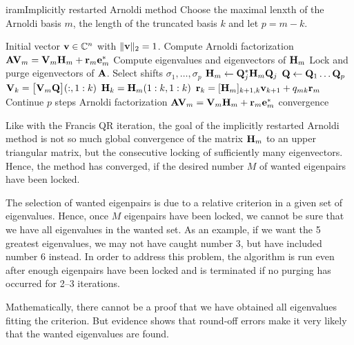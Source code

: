 \begin{Algorithm*}{iram}{Implicitly restarted Arnoldi method}
  Choose the maximal lenxth of the Arnoldi basis $m$, the length of
  the truncated basis $k$ and let $p=m-k$.
  \begin{algorithmic}[1]
    \Require Initial vector $\mathbf v\in\mathbb C^n$ with $\lVert\mathbf v\rVert_2=1$.
    \State Compute Arnoldi factorization
    $\mathbf A\mathbf V_m = \mathbf V_m\mathbf H_m + \mathbf r_m\mathbf e_m^*$
    \Repeat
    \State Compute eigenvalues and eigenvectors of $\mathbf H_m$
    \State Lock and purge eigenvectors of $\mathbf A$.
    \State Select shifts $\sigma_1,\dots,\sigma_p$
    \State $\mathbf H_m \gets \mathbf Q_j^*\mathbf H_m\mathbf Q_j$
    \EndFor
    \State $\mathbf Q \gets \mathbf Q_1\dots\mathbf Q_p$
    \State $\mathbf V_k = \bigl[\mathbf V_m\mathbf Q\bigr](:,1:k)$
    \State $\mathbf H_k = \mathbf H_m(1:k,1:k)$
    \State $\mathbf r_k= [\mathbf H_m]_{k+1,k}\mathbf v_{k+1} + q_{mk}\mathbf r_m$
    \State Continue $p$ steps Arnoldi factorization
    $\mathbf A\mathbf V_m = \mathbf V_m\mathbf H_m + \mathbf r_m\mathbf e_m^*$
    \Until convergence
  \end{algorithmic}
\end{Algorithm*}

\begin{remark}
  Like with the Francis QR iteration, the goal of the implicitly
  restarted Arnoldi method is not so much global convergence of the
  matrix $\mathbf H_m$ to an upper triangular matrix, but the consecutive
  locking of sufficiently many eigenvectors.
  Hence, the method has converged, if the desired number $M$ of wanted
  eigenpairs have been locked.

  The selection of wanted eigenpairs is due to a relative criterion in
  a given set of eigenvalues. Hence, once $M$ eigenpairs have been
  locked, we cannot be sure that we have all eigenvalues in the wanted
  set. As an example, if we want the 5 greatest eigenvalues, we may
  not have caught number 3, but have included number 6 instead. In
  order to address this problem, the algorithm is run even after
  enough eigenpairs have been locked and is terminated if no purging
  has occurred for 2--3 iterations.

  Mathematically, there cannot be a proof that we have obtained all
  eigenvalues fitting the criterion. But evidence shows that round-off
  errors make it very likely that the wanted eigenvalues are found.
\end{remark}

